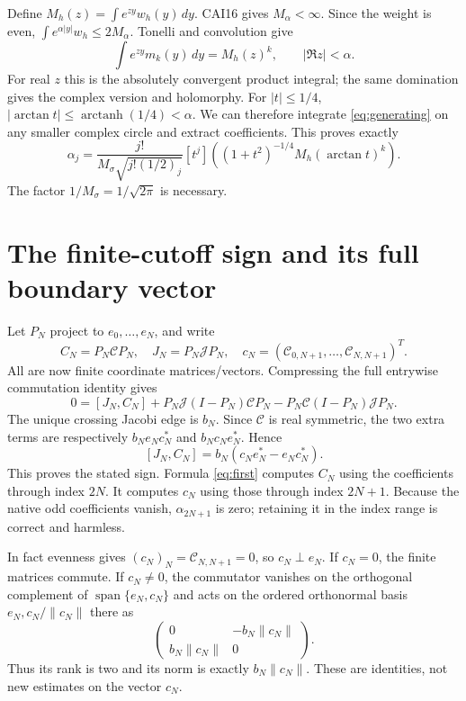 \documentclass[11pt]{article}
\newcommand{\J}{\mathcal J}
\newcommand{\CC}{\mathcal C}
\begin{document}
Define $M_h(z)=\int e^{zy}w_h(y)\,dy$. CAI16 gives
$M_\alpha<\infty$. Since the weight is even,
$\int e^{\alpha|y|}w_h\leq2M_\alpha$. Tonelli and convolution give
\[
 \int e^{zy}m_k(y)\,dy=M_h(z)^k,
 \qquad |\Re z|<\alpha.
\]
For real $z$ this is the absolutely convergent product integral;
the same domination gives the complex version and holomorphy.
For $|t|\leq1/4$,
$|\arctan t|\leq\operatorname{arctanh}(1/4)<\alpha$.
We can therefore integrate \eqref{eq:generating} on any smaller
complex circle and extract coefficients. This proves exactly
\begin{equation}\label{eq:alpha-generating}
 \boxed{\alpha_j=
 \frac{j!}{M_\sigma\sqrt{j!(1/2)_j}}
 [t^j]\left((1+t^2)^{-1/4}M_h(\arctan t)^k\right).}
\end{equation}
The factor $1/M_\sigma=1/\sqrt{2\pi}$ is necessary.

\section{The finite-cutoff sign and its full boundary vector}

Let $P_N$ project to $e_0,\ldots,e_N$, and write
\[
 C_N=P_N\CC P_N,\quad J_N=P_N\J P_N,\quad
 c_N=(\CC_{0,N+1},\ldots,\CC_{N,N+1})^T.
\]
All are now finite coordinate matrices/vectors. Compressing the
full entrywise commutation identity gives
\[
 0=[J_N,C_N]+P_N\J(I-P_N)\CC P_N
                    -P_N\CC(I-P_N)\J P_N.
\]
The unique crossing Jacobi edge is $b_N$. Since $\CC$ is real
symmetric, the two extra terms are respectively $b_Ne_Nc_N^*$
and $b_Nc_Ne_N^*$. Hence
\begin{equation}\label{eq:cutoff}
 \boxed{[J_N,C_N]=b_N(c_Ne_N^*-e_Nc_N^*).}
\end{equation}
This proves the stated sign. Formula \eqref{eq:first} computes
$C_N$ using the coefficients through index $2N$. It computes $c_N$
using those through index $2N+1$. Because the native odd coefficients
vanish, $\alpha_{2N+1}$ is zero; retaining it in the index range is
correct and harmless.

In fact evenness gives $(c_N)_N=\CC_{N,N+1}=0$, so $c_N\perp e_N$.
If $c_N=0$, the finite matrices commute. If $c_N\ne0$, the
commutator vanishes on the orthogonal complement of
$\operatorname{span}\{e_N,c_N\}$ and acts on the ordered orthonormal
basis $e_N,c_N/\|c_N\|$ there as
\[
 \begin{pmatrix}0&-b_N\|c_N\|\\b_N\|c_N\|&0\end{pmatrix}.
\]
Thus its rank is two and its norm is exactly $b_N\|c_N\|$.
These are identities, not new estimates on the vector $c_N$.
\end{document}
